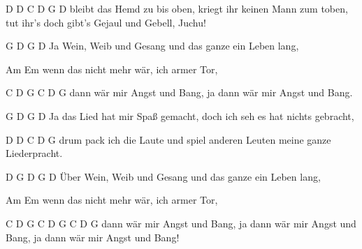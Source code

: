            D                            D                                C             D          G       D
bleibt das Hemd zu bis oben, kriegt ihr keinen Mann zum toben, tut ihr's doch gibt's Gejaul und Gebell, Juchu!



   G     D          G                            D
Ja Wein, Weib und Gesang und das ganze ein Leben lang,

     Am                      Em
wenn das nicht mehr wär, ich armer Tor,

     C       D         G             C       D         G
dann wär mir Angst und Bang, ja dann wär mir Angst und Bang.


       G            D      G                                   D
Ja das Lied hat mir Spaß gemacht, doch ich seh es hat nichts gebracht,

     D                      D                          C     D     G
drum pack ich die Laute und spiel anderen Leuten meine ganze Liederpracht.



D    G     D          G                            D
Über Wein, Weib und Gesang und das ganze ein Leben lang,

     Am                      Em
wenn das nicht mehr wär, ich armer Tor,

     C       D         G             C       D         G             C       D         G
dann wär mir Angst und Bang, ja dann wär mir Angst und Bang, ja dann wär mir Angst und Bang!
